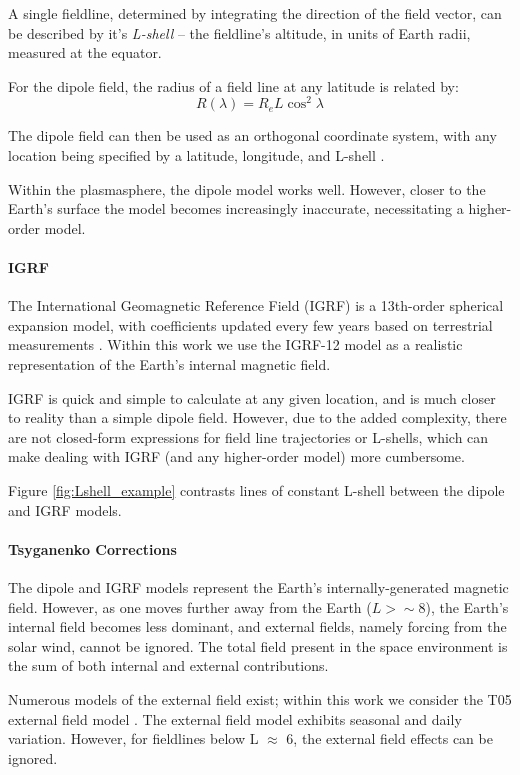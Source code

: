 A single fieldline, determined by integrating the direction of the field vector, can be described by it's \emph{L-shell} -- the fieldline's altitude, in units of Earth radii, measured at the equator. 

For the dipole field, the radius of a field line at any latitude is related by:
\begin{equation}
R(\lambda) = R_e L \cos^2 \lambda
\end{equation}


The dipole field can then be used as an orthogonal coordinate system, with any location being specified by a latitude, longitude, and L-shell \citep{McIlwain1961}. 

Within the plasmasphere, the dipole model works well. However, closer to the Earth's surface the model becomes increasingly inaccurate, necessitating a higher-order model.
\paragraph{IGRF}
The International Geomagnetic Reference Field (IGRF) is a 13th-order spherical expansion model, with coefficients updated every few years based on terrestrial measurements \citep{Thebault2015}. Within this work we use the IGRF-12 model as a realistic representation of the Earth's internal magnetic field.

IGRF is quick and simple to calculate at any given location, and is much closer to reality than a simple dipole field. However, due to the added complexity, there are not closed-form expressions for field line trajectories or L-shells, which can make dealing with IGRF (and any higher-order model) more cumbersome.

Figure \ref{fig:Lshell_example} contrasts lines of constant L-shell between the dipole and IGRF models.

\paragraph{Tsyganenko Corrections}
The dipole and IGRF models represent the Earth's internally-generated magnetic field. However, as one moves further away from the Earth ($L > \sim 8$), the Earth's internal field becomes less dominant, and external fields, namely forcing from the solar wind, cannot be ignored. The total field present in the space environment is the sum of both internal and external contributions.

Numerous models of the external field exist; within this work we consider the T05 external field model \citep{Tsyganenko2005}. The external field model exhibits seasonal and daily variation. However, for fieldlines below L $\approx$ 6, the external field effects can be ignored. 

